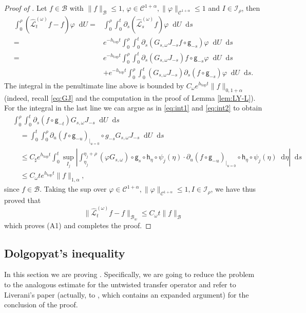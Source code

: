 \documentclass[11pt,letterpaper]{amsart}
\newcommand \cI {{\mathcal I}}
\newcommand \cL {{\mathcal L}}
\newcommand \cB {{\mathscr B}}
\newcommand \cC {{\mathscr{C}}}
\newcommand \sC {{C_\sharp}}
\newcommand{\horo}{\mathsf{h}}
\newcommand{\geo}{\mathsf{g}}
\newcommand*{\diff}{\mathop{}\!\mathrm{d}}
\DeclareMathOperator{\topp}{top}
\theoremstyle{definition}
\begin{document}
\begin{proof}[Proof of ]
Let $f\in \cB$ with $\|f\|_{\cB}\le 1$, $\varphi\in \cC^{1+\alpha}, \|\varphi\|_{\cC^{1+\alpha}}\le 1$ and $I\in \cI_\rho$, then
\[
\begin{split}
\int_0^\rho (\hat\cL^{(\omega)}_t f-f)\varphi \diff U=&\int_0^\rho \int_0^t \partial_s(\hat\cL^{(\omega)}_s f)\varphi \diff U\diff s\\
%
=&e^{-h_{\topp}t} \int_0^\rho \int_0^t \partial_s(G_{s,\omega}J_{-s}f\circ \geo_{-s})\varphi \diff U \diff s\\
%
=& e^{-h_{\topp}t}\int_0^\rho \int_0^t \partial_s(G_{s,\omega}J_{-s})f\circ \geo_{-s}\varphi \diff U \diff s\\
%
&+ e^{-h_{\topp}t}  \int_0^\rho \int_0^t (G_{s,\omega}J_{-s}) \partial_s(f\circ \geo_{-s})\varphi\diff U \diff s.
\end{split}
\]
The integral in the penultimate line above is bounded by $C_\omega e^{h_{\topp}t } \|f\|_{0,1+\alpha}$ (indeed, recall \eqref{eq:GJ} and the computation in the proof of Lemma \ref{lem:LY-L}). For the integral in the last line  we can argue as in \eqref{eq:int1} and \eqref{eq:int2} to obtain 
\[
\begin{split}
&\int_0^\rho \int_0^t  \partial_s(f\circ \geo_{-t}) G_{s,\omega}J_{-s}\diff U \diff s \\
%
& \quad =\int_0^t \int_0^\rho  \partial_u(f\circ \geo_{-u})_{|_{u=0}}\circ g_{-s} G_{s,\omega}J_{-s}\diff U \diff s\\
%
&\quad\le \sC e^{h_{\topp}t}\int_0^t  \sup_{I_j}\left| \int_{\eta_j}^{\eta_j+\rho}  (\varphi G_{s,\omega})\circ \geo_s\circ \horo_\eta\circ \psi_j(\eta) \cdot \partial_u(f\circ \geo_{-u})_{|_{u=0}}\circ \horo_\eta \circ \psi_j(\eta)\diff \eta \right|\diff s\\
%
&\quad\le  C_\omega t e^{h_{\topp}t} \|f\|_{1,\alpha},
\end{split}
\]
since $f\in \cB$. Taking the sup over $\varphi \in \cC^{1+\alpha}, \|\varphi\|_{\cC^{1+\alpha}}\le 1, I\in \cI_\rho$, we have thus proved that
\[
\|\hat\cL^{(\omega)}_t f-f\|_{\cB_w} \le C_\omega t \|f\|_{\cB}
\]
which proves (A1) and completes the proof.
\end{proof}

\subsection{Dolgopyat's inequality}\label{sec:dolgopyat_inequality}

In this section we are proving . Specifically, we are going to reduce the problem to the analogous estimate for the untwisted transfer operator and refer to Liverani's paper \cite{Liv} (actually, to \cite[Chapter 5]{DeKiLi}, which contains an expanded argument) for the conclusion of the proof.
\end{document}
